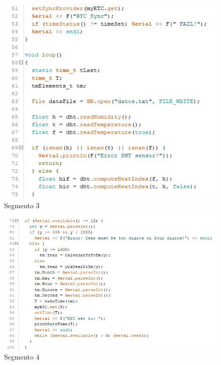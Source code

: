 \begin{flushleft}
    \begin{figure}[H]
        \includegraphics{imagenes/codigo3.jpg}
        \caption*{Segmento 3}
    \end{figure}
    
    \begin{figure}[H]
        \includegraphics{imagenes/codigo4.jpg}
        \caption*{Segmento 4}
    \end{figure}
    

\end{flushleft}

